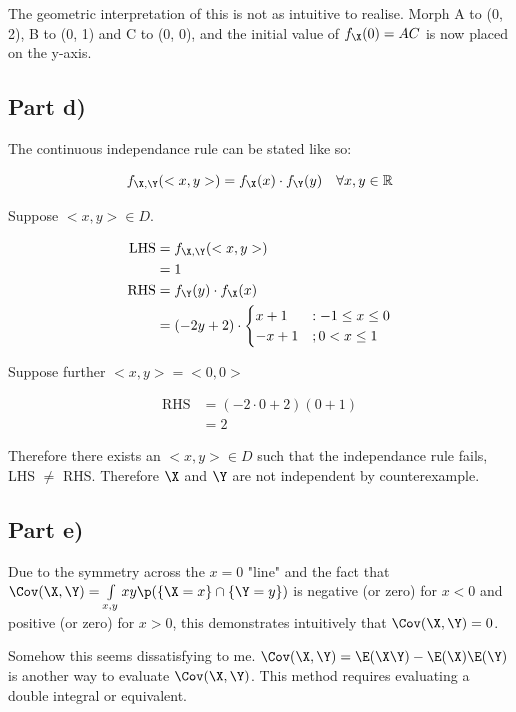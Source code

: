 The geometric interpretation of this is not as intuitive to realise.
Morph A to (0, 2), B to (0, 1) and C to (0, 0), and the initial
value of $f_\X(0) = AC$ is now placed on the y-axis.

\subsection{Part d)}

The continuous independance rule can be stated like so:

\begin{equation*}
f_{\X, \Y}(<x, y>) = f_\X(x) \cdot f_\Y(y) \quad \forall x,y\in \mathbb{R}
\end{equation*}

Suppose $<x, y> \in D$.

\begin{align*}
\text{LHS} &= f_{\X, \Y}(<x, y>) \\
&= 1 \\
\text{RHS} &= f_\Y(y) \cdot f_\X(x) \\
&= (-2y + 2) \cdot \begin{cases}
x + 1 &: -1 \leq x \leq 0 \\
-x + 1 &; 0 < x \leq 1 \\
\end{cases}
\end{align*}

Suppose further $<x, y> = <0, 0>$

\begin{align*}
\text{RHS} &= (-2 \cdot 0 + 2)(0 + 1) \\
&= 2
\end{align*}

Therefore there exists an $<x, y> \in D$ such that the independance rule fails, LHS $\neq$ RHS.
Therefore $\X$ and $\Y$ are not independent by counterexample.

\subsection{Part e)}

Due to the symmetry across the $x=0$ "line" and the fact that $\Cov(\X, \Y) = \int \limits _{x,y} xy\p(\{ \X = x\} \cap \{ \Y = y \})$
is negative (or zero) for $x < 0$ and positive (or zero) for $x > 0$, this demonstrates intuitively that $\Cov(\X, \Y) = 0$.

Somehow this seems dissatisfying to me.
$\Cov(\X, \Y) = \E(\X\Y) - \E(\X)\E(\Y)$ is another way to evaluate $\Cov(\X, \Y)$.
This method requires evaluating a double integral or equivalent.

